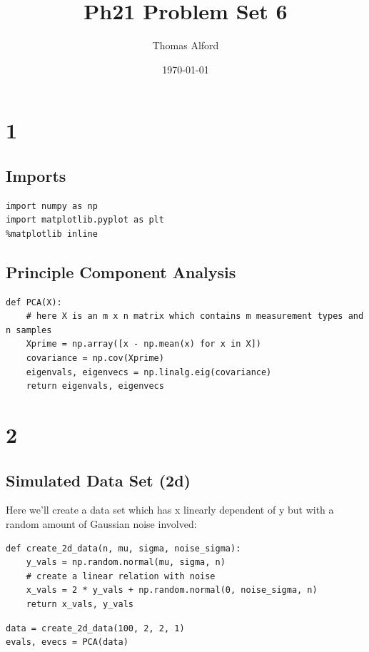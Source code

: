 \documentclass[11pt]{article}
\author{Thomas Alford}
\date{\today}
\title{Ph21 Problem Set 6}
\begin{document}
\maketitle
\section*{1}
\label{sec-1}
\subsection*{Imports}
\label{sec-1-1}
\begin{verbatim}
import numpy as np
import matplotlib.pyplot as plt
%matplotlib inline
\end{verbatim}

\subsection*{Principle Component Analysis}
\label{sec-1-2}

\begin{verbatim}
def PCA(X):
    # here X is an m x n matrix which contains m measurement types and n samples
    Xprime = np.array([x - np.mean(x) for x in X])
    covariance = np.cov(Xprime)
    eigenvals, eigenvecs = np.linalg.eig(covariance)
    return eigenvals, eigenvecs
\end{verbatim}

\section*{2}
\label{sec-2}
\subsection*{Simulated Data Set (2d)}
\label{sec-2-1}

Here we'll create a data set which has x linearly dependent of y but with a
random amount of Gaussian noise involved:

\begin{verbatim}
def create_2d_data(n, mu, sigma, noise_sigma):
    y_vals = np.random.normal(mu, sigma, n)
    # create a linear relation with noise
    x_vals = 2 * y_vals + np.random.normal(0, noise_sigma, n) 
    return x_vals, y_vals
\end{verbatim}


\begin{verbatim}
data = create_2d_data(100, 2, 2, 1)
evals, evecs = PCA(data)
\end{verbatim}
\end{document}
